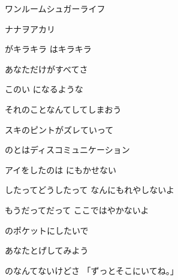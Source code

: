 \documentclass[a4paper,tate,twocolumn,12pt]{ltjtarticle}
\begin{document}
\thispagestyle{empty}

\begin{center}
{\LARGE ワンルームシュガーライフ}

{\large ナナヲアカリ}
\end{center}

\vspace{1em}

\begin{flushleft}

\noindent\begin{minipage}{\linewidth}
がキラキラ はキラキラ

あなただけがすべてさ

このい になるような

それのことなんてしてしまおう
\end{minipage}

\vspace{2em}

\noindent\begin{minipage}{\linewidth}
スキのピントがズレていって

のとはディスコミュニケーション

アイをしたのは にもかせない
\end{minipage}

\vspace{2em}

\noindent\begin{minipage}{\linewidth}
したってどうしたって なんにもれやしないよ

もうだってだって ここではやかないよ

のポケットにしたいで

あなたとげしてみよう
\end{minipage}

\vspace{2em}

\noindent\begin{minipage}{\linewidth}
のなんてないけどさ 「ずっとそこにいてね。」
\end{minipage}


\end{flushleft}
\end{document}
